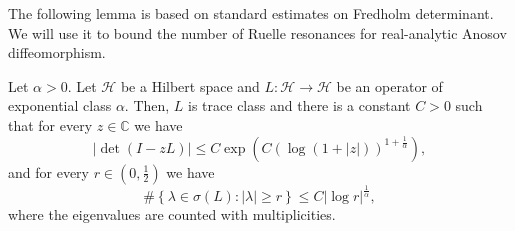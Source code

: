 \documentclass[AHL,Unicode,longabstracts,published]{cedram}
\newcommand{\set}[1]{\left\{ #1 \right\}}
\newcommand{\p}[1]{\left(#1\right)}
\newcommand{\va}[1]{\left|#1\right|}
\newcommand{\clH}{\mathcal{H}}
\newcommand{\bbC}{\mathbb{C}}
\begin{document}
The following lemma is based on standard estimates on Fredholm determinant. We will use it to bound the number of Ruelle resonances for real-analytic Anosov diffeomorphism.

\begin{lemm}\label{lemma:order_exponential}
Let $\alpha > 0$. Let $\clH$ be a Hilbert space and $L : \clH \to \clH$ be an operator of exponential class $\alpha$. Then, $L$ is trace class and there is a constant $C > 0$ such that for every $z \in \bbC$ we have
\begin{equation*}
\va{\det\p{ I - z L}} \leq C \exp\p{C \p{\log(1 + \va{z})}^{1+ \frac{1}{\alpha}}},
\end{equation*}
and for every $r \in (0,\frac{1}{2})$ we have
\begin{equation}\label{eq:bound_eigenvalues}
\# \set{ \lambda \in \sigma(L) : \va{\lambda} \geq r} \leq C |\log r|^{\frac{1}{\alpha}},
\end{equation}
where the eigenvalues are counted with multiplicities.
\end{lemm}
\end{document}
